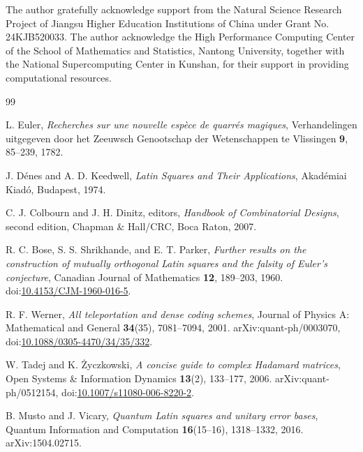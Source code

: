 \documentclass[a4paper,11pt]{article}
\begin{document}
The author gratefully acknowledge support from the Natural Science Research Project of Jiangsu Higher Education Institutions of China under Grant No. 24KJB520033. The author acknowledge the High Performance Computing Center of the School of Mathematics and Statistics, Nantong University, together with the National Supercomputing Center in Kunshan, for their support in providing computational resources.
\begin{thebibliography}{99}

L. Euler,
\newblock \emph{Recherches sur une nouvelle esp\`ece de quarr\'es magiques},
\newblock Verhandelingen uitgegeven door het Zeeuwsch Genootschap der Wetenschappen te Vlissingen
\textbf{9}, 85--239, 1782.

J. D\'enes and A. D. Keedwell,
\newblock \emph{Latin Squares and Their Applications},
\newblock Akad\'emiai Kiad\'o, Budapest, 1974.

C. J. Colbourn and J. H. Dinitz, editors,
\newblock \emph{Handbook of Combinatorial Designs}, second edition,
\newblock Chapman \& Hall/CRC, Boca Raton, 2007.

R. C. Bose, S. S. Shrikhande, and E. T. Parker,
\newblock \emph{Further results on the construction of mutually orthogonal Latin squares and the falsity of Euler's conjecture},
\newblock Canadian Journal of Mathematics \textbf{12}, 189--203, 1960.
\newblock doi:\href{https://doi.org/10.4153/CJM-1960-016-5}{10.4153/CJM-1960-016-5}.

R. F. Werner,
\newblock \emph{All teleportation and dense coding schemes},
\newblock Journal of Physics A: Mathematical and General \textbf{34}(35), 7081--7094, 2001.
\newblock arXiv:quant-ph/0003070, doi:\href{https://doi.org/10.1088/0305-4470/34/35/332}{10.1088/0305-4470/34/35/332}.

W. Tadej and K. \.{Z}yczkowski,
\newblock \emph{A concise guide to complex Hadamard matrices},
\newblock Open Systems \& Information Dynamics \textbf{13}(2), 133--177, 2006.
\newblock arXiv:quant-ph/0512154, doi:\href{https://doi.org/10.1007/s11080-006-8220-2}{10.1007/s11080-006-8220-2}.

B. Musto and J. Vicary,
\newblock \emph{Quantum Latin squares and unitary error bases},
\newblock Quantum Information and Computation \textbf{16}(15--16), 1318--1332, 2016.
\newblock arXiv:1504.02715.


\end{thebibliography}
\end{document}
